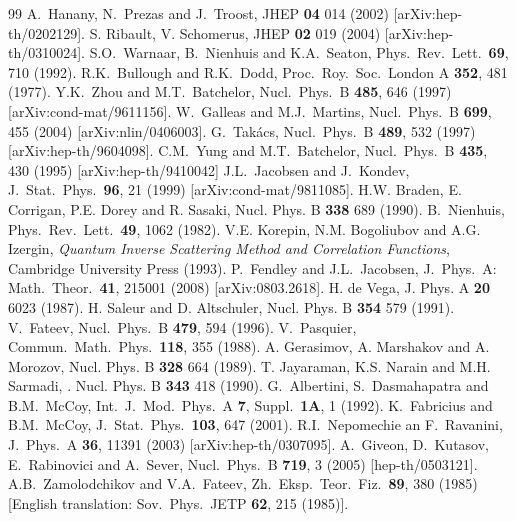 \documentclass[11pt]{article}
\begin{document}
\begin{thebibliography}{99}
 A.\ Hanany, N.\ Prezas and J.\ Troost,
 JHEP {\bf 04} 014 (2002) [arXiv:hep-th/0202129].
 S. Ribault, V. Schomerus,
 JHEP {\bf 02} 019  (2004) [arXiv:hep-th/0310024].
 S.O.\ Warnaar, B.\ Nienhuis and K.A.\ Seaton,
 Phys.\ Rev.\ Lett.\ {\bf 69}, 710 (1992).
 R.K.\ Bullough and R.K.\ Dodd,
 Proc.\ Roy.\ Soc.\ London A {\bf 352}, 481 (1977).
  Y.K.\ Zhou and M.T.\ Batchelor,
 Nucl.\ Phys.\ B {\bf 485}, 646 (1997) [arXiv:cond-mat/9611156].
 W.\ Galleas and M.J.\ Martins,
 Nucl.\ Phys.\ B {\bf 699}, 455 (2004) [arXiv:nlin/0406003].
 G.\ Tak\'acs,
 Nucl.\ Phys.\ B {\bf 489}, 532 (1997) [arXiv:hep-th/9604098].
 C.M.\ Yung and M.T.\  Batchelor,
 Nucl.\ Phys.\ B {\bf 435}, 430 (1995) [arXiv:hep-th/9410042]
  J.L.\ Jacobsen and J.\ Kondev,
 J.\ Stat.\ Phys.\ {\bf 96}, 21 (1999) [arXiv:cond-mat/9811085].
  H.W. Braden, E. Corrigan, P.E. Dorey and R. Sasaki, Nucl.  Phys. B {\bf 338} 689 (1990).
 B.\ Nienhuis,
 Phys.\ Rev.\ Lett.\ {\bf 49}, 1062 (1982).
   V.E. Korepin, N.M. Bogoliubov and A.G. Izergin, {\em Quantum Inverse Scattering Method and Correlation Functions}, Cambridge University Press (1993).
 P.\ Fendley and J.L.\ Jacobsen,
 J.\ Phys.\ A: Math.\ Theor.\ {\bf 41}, 215001 (2008) [arXiv:0803.2618].
    H. de Vega, J. Phys. A {\bf 20} 6023 (1987).
       H. Saleur and D. Altschuler, Nucl. Phys. B {\bf 354} 579 (1991).
 V.\ Fateev, Nucl.\ Phys.\ B {\bf 479}, 594 (1996).
 V.\ Pasquier, Commun.\ Math.\ Phys.\ {\bf 118}, 355 (1988).
   A. Gerasimov, A. Marshakov and A. Morozov, Nucl. Phys. B {\bf 328} 664 (1989).
      T. Jayaraman,  K.S. Narain and   M.H. Sarmadi, . Nucl. Phys. B {\bf 343} 418 (1990).
 G.\ Albertini, S.\ Dasmahapatra and B.M.\ McCoy,
 Int.\ J.\ Mod.\ Phys.\ A {\bf 7}, Suppl.\ {\bf 1A}, 1 (1992).
 K.\ Fabricius and B.M.\ McCoy,
 J.\ Stat.\ Phys.\ {\bf 103}, 647 (2001).
 R.I.\ Nepomechie an F.\ Ravanini,
 J.\ Phys.\ A {\bf 36}, 11391 (2003) [arXiv:hep-th/0307095].
 A.\ Giveon, D.\ Kutasov, E.\ Rabinovici and A.\ Sever,
 Nucl.\ Phys.\ B {\bf 719}, 3 (2005) [hep-th/0503121].
 A.B.\ Zamolodchikov and V.A.\ Fateev,
 Zh.\ Eksp.\ Teor.\ Fiz.\ {\bf 89}, 380 (1985) [English translation: Sov.\ Phys.\ JETP {\bf 62}, 215 (1985)].

\end{thebibliography}
\end{document}
